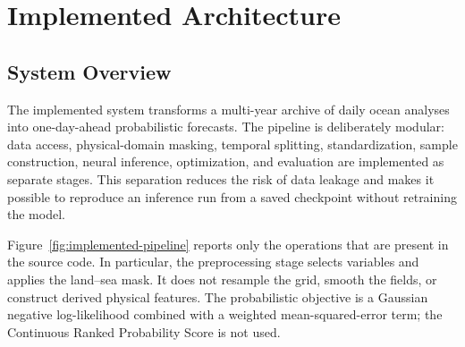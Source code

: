 \chapter{Implemented Architecture}
\label{chap:architecture}

\section{System Overview}

The implemented system transforms a multi-year archive of daily ocean analyses into one-day-ahead probabilistic forecasts. The pipeline is deliberately modular: data access, physical-domain masking, temporal splitting, standardization, sample construction, neural inference, optimization, and evaluation are implemented as separate stages. This separation reduces the risk of data leakage and makes it possible to reproduce an inference run from a saved checkpoint without retraining the model.

Figure~\ref{fig:implemented-pipeline} reports only the operations that are present in the source code. In particular, the preprocessing stage selects variables and applies the land--sea mask. It does not resample the grid, smooth the fields, or construct derived physical features. The probabilistic objective is a Gaussian negative log-likelihood combined with a weighted mean-squared-error term; the Continuous Ranked Probability Score is not used.

